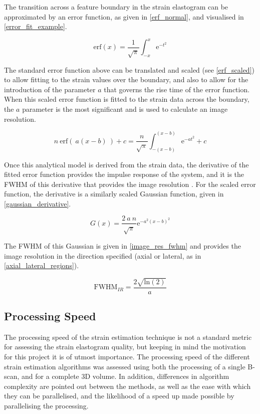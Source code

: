 The transition across a feature boundary in the strain elastogram can be approximated by an error function, as given in \autoref{erf_normal}, and visualised in \autoref{error_fit_example}. 

\begin{equation}
	\text{erf}(x)=\frac{1}{\sqrt{\pi}} \int_{-x}^{x} \text{e}^{-t^2}
	\label{erf_normal}
\end{equation}

The standard error function above can be translated and scaled (see \autoref{erf_scaled}) to allow fitting to the strain values over the boundary, and also to allow for the introduction of the parameter $a$ that governs the rise time of the error function. When this scaled error function is fitted to the strain data across the boundary, the $a$ parameter is the most significant and is used to calculate an image resolution.

\begin{equation}
	n \: \text{erf}(\:a(x-b)\:) + c = \frac{n}{\sqrt{\pi}} \int_{-(x-b)}^{(x-b)} \text{e}^{-a t^2} + c
	\label{erf_scaled}
\end{equation}

Once this analytical model is derived from the strain data, the derivative of the fitted error function provides the impulse response of the system, and it is the FWHM of this derivative that provides the image resolution \cite{hepburn_improving_2017}. For the scaled error function, the derivative is a similarly scaled Gaussian function, given in \autoref{gaussian_derivative}.

\begin{equation}
	G(x) = \frac{2\:a\:n}{\sqrt{\pi}} \text{e}^{-a^2 (x-b)^2}
	\label{gaussian_derivative}
\end{equation}

The FWHM of this Gaussian is given in \autoref{image_res_fwhm} and provides the image resolution in the direction specified (axial or lateral, as in \autoref{axial_lateral_regions}).

\begin{equation}
	\text{FWHM}_{IR} = \frac{2 \sqrt{\text{ln}(2)}}{a}
	\label{image_res_fwhm}
\end{equation}

\subsection{Processing Speed}
The processing speed of the strain estimation technique is not a standard metric for assessing the strain elastogram quality, but keeping in mind the motivation for this project it is of utmost importance.
The processing speed of the different strain estimation algorithms was assessed using both the processing of a single B-scan, and for a complete 3D volume. In addition, differences in algorithm complexity are pointed out between the methods, as well as the ease with which they can be parallelised, and the likelihood of a speed up made possible by parallelising the processing.



